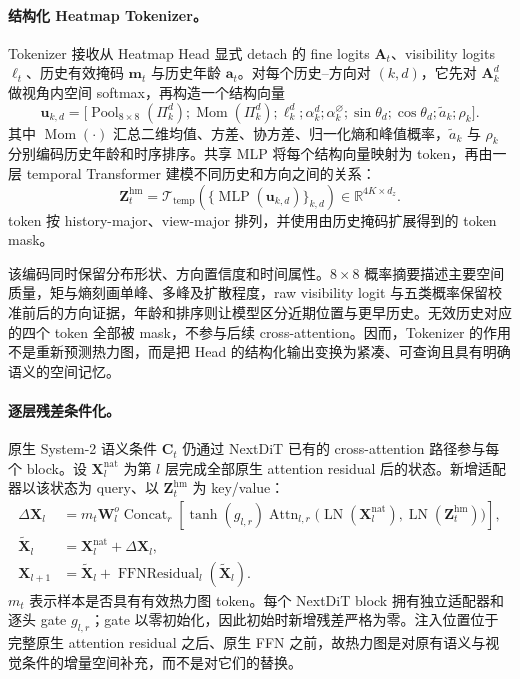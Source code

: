 \documentclass[10pt]{ctexart}
\begin{document}
\paragraph{结构化 Heatmap Tokenizer。}
Tokenizer 接收从 Heatmap Head 显式 detach 的 fine logits $\mathbf{A}_t$、visibility logits $\bm{\ell}_t$、历史有效掩码 $\mathbf{m}_t$ 与历史年龄 $\mathbf{a}_t$。对每个历史--方向对 $(k,d)$，它先对 $\mathbf{A}_k^d$ 做视角内空间 softmax，再构造一个结构向量
\begin{equation}
  \mathbf{u}_{k,d}
  =\bigl[
    \operatorname{Pool}_{8\times8}(\Pi_k^d);
    \operatorname{Mom}(\Pi_k^d);
    \ell_k^d;\alpha_k^d;\alpha_k^{\varnothing};
    \sin\theta_d;\cos\theta_d;
    \widetilde{a}_k;\rho_k
  \bigr].
\end{equation}
其中 $\operatorname{Mom}(\cdot)$ 汇总二维均值、方差、协方差、归一化熵和峰值概率，$\widetilde{a}_k$ 与 $\rho_k$ 分别编码历史年龄和时序排序。共享 MLP 将每个结构向量映射为 token，再由一层 temporal Transformer 建模不同历史和方向之间的关系：
\begin{equation}
  \mathbf{Z}^{\mathrm{hm}}_t
  =\mathcal{T}_{\mathrm{temp}}
   \left(
   \{\operatorname{MLP}(\mathbf{u}_{k,d})\}_{k,d}
   \right)
  \in\mathbb{R}^{4K\times d_z}.
\end{equation}
token 按 history-major、view-major 排列，并使用由历史掩码扩展得到的 token mask。

该编码同时保留分布形状、方向置信度和时间属性。$8\times8$ 概率摘要描述主要空间质量，矩与熵刻画单峰、多峰及扩散程度，raw visibility logit 与五类概率保留校准前后的方向证据，年龄和排序则让模型区分近期位置与更早历史。无效历史对应的四个 token 全部被 mask，不参与后续 cross-attention。因而，Tokenizer 的作用不是重新预测热力图，而是把 Head 的结构化输出变换为紧凑、可查询且具有明确语义的空间记忆。

\paragraph{逐层残差条件化。}
原生 System-2 语义条件 $\mathbf{C}_t$ 仍通过 NextDiT 已有的 cross-attention 路径参与每个 block。设 $\mathbf{X}_{l}^{\mathrm{nat}}$ 为第 $l$ 层完成全部原生 attention residual 后的状态。新增适配器以该状态为 query、以 $\mathbf{Z}^{\mathrm{hm}}_t$ 为 key/value：
\begin{align}
  \Delta\mathbf{X}_{l}
  &=m_t\mathbf{W}_{l}^{o}
    \operatorname{Concat}_{r}
    \left[
      \tanh(g_{l,r})
      \operatorname{Attn}_{l,r}
      \bigl(\operatorname{LN}(\mathbf{X}_{l}^{\mathrm{nat}}),
            \operatorname{LN}(\mathbf{Z}^{\mathrm{hm}}_t)\bigr)
    \right], \\
  \widetilde{\mathbf{X}}_{l}
  &=\mathbf{X}_{l}^{\mathrm{nat}}+\Delta\mathbf{X}_{l}, \\
  \mathbf{X}_{l+1}
  &=\widetilde{\mathbf{X}}_{l}
    +\operatorname{FFNResidual}_{l}
     (\widetilde{\mathbf{X}}_{l}).
\end{align}
$m_t$ 表示样本是否具有有效热力图 token。每个 NextDiT block 拥有独立适配器和逐头 gate $g_{l,r}$；gate 以零初始化，因此初始时新增残差严格为零。注入位置位于完整原生 attention residual 之后、原生 FFN 之前，故热力图是对原有语义与视觉条件的增量空间补充，而不是对它们的替换。
\end{document}
